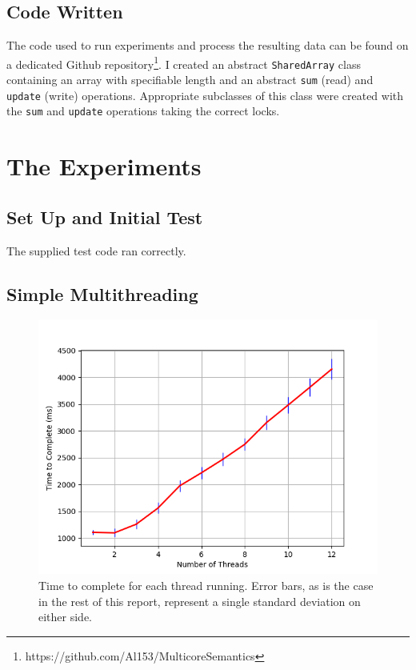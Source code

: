 \documentclass[11pt]{article}
\begin{document}
\subsection{Code Written}
The code used to run experiments and process the resulting data can be found on a dedicated Github repository\footnote{https://github.com/Al153/MulticoreSemantics}. I created an abstract \texttt{SharedArray} class containing an array with specifiable length and an abstract \texttt{sum} (read) and \texttt{update} (write) operations. Appropriate subclasses of this class were created with the \texttt{sum} and \texttt{update} operations taking the correct locks.


\section{The Experiments}
\subsection{Set Up and Initial Test}
The supplied test code ran correctly.
\subsection{Simple Multithreading}
\begin{figure}
\centering
\includegraphics[scale=0.65]{step2.png}
 \caption{Time to complete for each thread running. Error bars, as is the case in the rest of this report, represent a single standard deviation on either side.}
 \label{fig:step2_1}
\end{figure}
\end{document}
